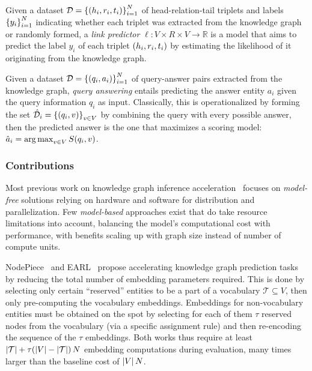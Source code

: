 \begin{definition}
    Given a dataset $\mathcal{D}=\mathopen{}\left\{\mathopen{}\left(h_i, r_i, t_i\right)\right\}_{i=1}^{N}$ of head-relation-tail triplets and labels $\mathopen{}\left\{y_i\right\}_{i=1}^{N}$ indicating whether each triplet was extracted from the knowledge graph or randomly formed, a \emph{link predictor} $\ell: V \times R \times V \to \mathbb{R}$ is a model that aims to predict the label $y_i$ of each triplet $\mathopen{}\left(h_i,r_i,t_i\right)$ by estimating the likelihood of it originating from the knowledge graph.
\end{definition}

\begin{definition}
    Given a dataset $\mathcal{D}=\mathopen{}\left\{\mathopen{}\left(q_i, a_i\right)\right\}_{i=1}^{N}$ of query-answer pairs extracted from the knowledge graph, \emph{query answering} entails predicting the answer entity $a_i$ given the query information $q_i$ as input. Classically, this is operationalized by forming the set $\hat{\mathcal{D}}_i=\mathopen{}\left\{\mathopen{}\left(q_i, v\right)\right\}_{v \in V}$ by combining the query with every possible answer, then the predicted answer is the one that maximizes a scoring model: $\hat{a}_i = \operatorname*{arg\,max}_{v \in V}{S\mathopen{}\left(q_i,v\right)}$.
\end{definition}

\subsubsection{Contributions}
Most previous work on knowledge graph inference acceleration~\cite{lerer_pytorch-biggraph_2019,zheng_dgl-ke_2020,ren_smore_2021} focuses on \emph{model-free} solutions relying on hardware and software for distribution and parallelization. Few \emph{model-based} approaches exist that do take resource limitations into account, balancing the model's computational cost with performance, with benefits scaling up with graph size instead of number of compute units.

NodePiece~\cite{galkin_nodepiece_2022} and EARL~\cite{chen_entity-agnostic_2023} propose accelerating knowledge graph prediction tasks by reducing the total number of embedding parameters required. This is done by selecting only certain \enquote{reserved} entities to be a part of a vocabulary $\mathcal{T} \subseteq V$, then only pre-computing the vocabulary embeddings. Embeddings for non-vocabulary entities must be obtained on the spot by selecting for each of them $\tau$ reserved nodes from the vocabulary (via a specific assignment rule) and then re-encoding the sequence of the $\tau$ embeddings. Both works thus require at least $\mathopen{}\left|\mathcal{T}\right| + \tau\mathopen{}\left(\mathopen{}\left|V\right|-\mathopen{}\left|\mathcal{T}\right|\right)N$ embedding computations during evaluation, many times larger than the baseline cost of $\mathopen{}\left|V\right|N$.


